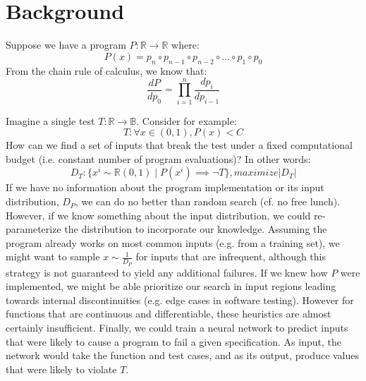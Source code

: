 \documentclass[12pt,initial,twoside,maitrise]{dms}
\numberwithin{equation}{section}
\numberwithin{table}{chapter}
\numberwithin{figure}{chapter}
\begin{document}
    \section{Background}

    Suppose we have a program $P: \mathbb{R}\rightarrow\mathbb{R}$ where:
    \begin{equation}
        P(x)=p_n \circ p_{n-1} \circ p_{n-2} \circ ... \circ p_1 \circ p_0
    \end{equation}
    From the chain rule of calculus, we know that:
    \begin{equation}
        \frac{dP}{dp_0} = {\displaystyle \prod_{i=1}^{n} \frac{dp_{i}}{dp_{i-1}}}
    \end{equation}

    Imagine a single test $T: \mathbb{R} \rightarrow \mathbb{B}$. Consider for example:
    \begin{equation}
        T: \forall x \in (0, 1), P(x) < C
    \end{equation}
    How can we find a set of inputs that break the test under a fixed computational budget (i.e. constant number of program evaluations)? In other words:
    \begin{equation}
        D_T: \{ x^i \sim \mathbb{R}(0, 1) \mid P(x^i) \implies \neg T \}, maximize |D_T|
    \end{equation}
    If we have no information about the program implementation or its input distribution, $D_P$, we can do no better than random search (cf. no free lunch). However, if we know something about the input distribution, we could re-parameterize the distribution to incorporate our knowledge. Assuming the program already works on most common inputs (e.g. from a training set), we might want to sample $x \sim \frac{1}{D_P}$ for inputs that are infrequent, although this strategy is not guaranteed to yield any additional failures. If we knew how $P$ were implemented, we might be able prioritize our search in input regions leading towards internal discontinuities (e.g. edge cases in software testing). However for functions that are continuous and differentiable, these heuristics are almost certainly insufficient. Finally, we could train a neural network to predict inputs that were likely to cause a program to fail a given specification. As input, the network would take the function and test cases, and as its output, produce values that were likely to violate $T$.
\end{document}
